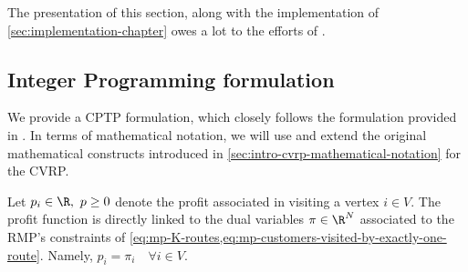 The presentation of this section,
along with the implementation of \cref{sec:implementation-chapter}
owes a lot to the efforts of \textcite{jepsen2014}.

\subsection{Integer Programming formulation}
\label{sec:cptp-integer-programming-formulation}

We provide a CPTP formulation, which closely follows the formulation provided in \textcite{jepsen2014}.
In terms of mathematical notation, we will use and extend the original
mathematical constructs introduced in \cref{sec:intro-cvrp-mathematical-notation} for the CVRP.

Let $p_i \in \R,\ p \ge 0$ denote the profit associated in visiting a vertex $i \in V$.
The profit function is directly linked to the dual variables $\pi \in \R^N$ associated to
the RMP's constraints of \cref{eq:mp-K-routes,eq:mp-customers-visited-by-exactly-one-route}.
Namely, $p_i = \pi_i \quad \forall i \in V$.

